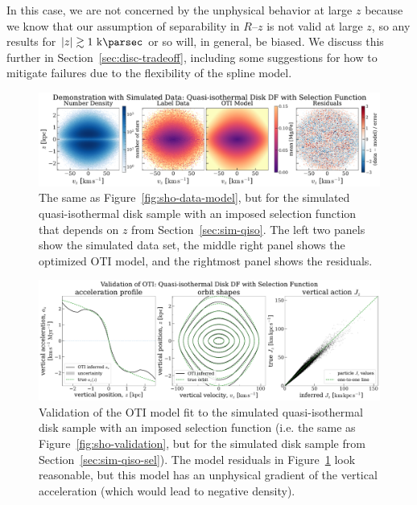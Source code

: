 In this case, we are not concerned by the unphysical behavior at large $z$ because we
know that our assumption of separability in $R$--$z$ is not valid at large $z$, so any
results for $|z| \gtrsim 1~\kpc$ or so will, in general, be biased.
We discuss this further in Section~\ref{sec:disc-tradeoff}, including some suggestions
for how to mitigate failures due to the flexibility of the spline model.


\begin{figure}[t!]
\begin{center}
\includegraphics[width=\textwidth]{qiso-sel-data-model.pdf}
\end{center}
\caption{%
The same as Figure~\ref{fig:sho-data-model}, but for the simulated quasi-isothermal disk
sample with an imposed selection function that depends on $z$ from
Section~\ref{sec:sim-qiso}.
The left two panels show the simulated data set, the middle right panel shows the
optimized OTI model, and the rightmost panel shows the residuals.
\label{fig:qiso-sel-data-model}
}
\end{figure}

\begin{figure}[t!]
\begin{center}
\includegraphics[width=\textwidth]{qiso-sel-validation.pdf}
\end{center}
\caption{%
Validation of the OTI model fit to the simulated quasi-isothermal disk sample with an
imposed selection function (i.e. the same as Figure~\ref{fig:sho-validation}, but for
the simulated disk sample from Section~\ref{sec:sim-qiso-sel}).
The model residuals in Figure~\ref{fig:qiso-sel-data-model} look reasonable, but this
model has an unphysical gradient of the vertical acceleration (which would lead to
negative density).
\label{fig:qiso-sel-validation}
}
\end{figure}


